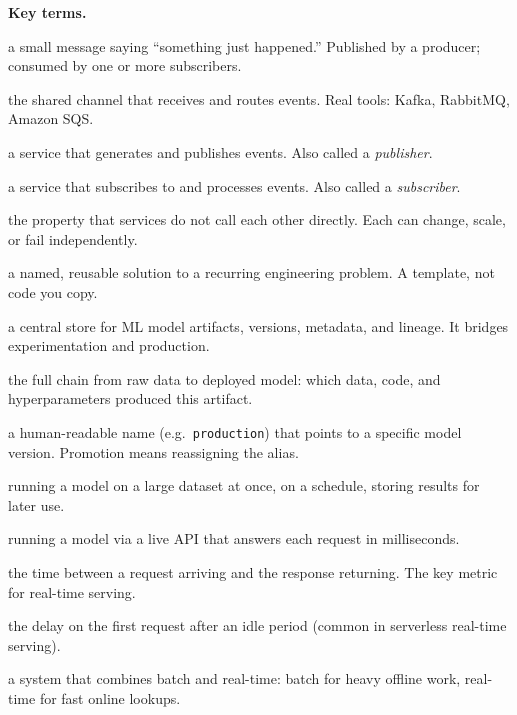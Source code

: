 \documentclass[a4paper,11pt]{article}
\begin{document}
\noindent\textbf{Key terms.}
\begin{description}[leftmargin=9.5em,style=nextline,font=\normalfont\bfseries\color{navy}]
  \item[event] a small message saying ``something just happened.''
        Published by a producer; consumed by one or more subscribers.
  \item[event bus] the shared channel that receives and routes events.
        Real tools: Kafka, RabbitMQ, Amazon SQS.
  \item[producer] a service that generates and publishes events.
        Also called a \emph{publisher}.
  \item[consumer] a service that subscribes to and processes events.
        Also called a \emph{subscriber}.
  \item[decoupling] the property that services do not call each other
        directly. Each can change, scale, or fail independently.
  \item[design pattern] a named, reusable solution to a recurring
        engineering problem. A template, not code you copy.
  \item[model registry] a central store for ML model artifacts, versions,
        metadata, and lineage. It bridges experimentation and production.
  \item[model lineage] the full chain from raw data to deployed model:
        which data, code, and hyperparameters produced this artifact.
  \item[alias] a human-readable name (e.g.\ \texttt{production}) that
        points to a specific model version. Promotion means reassigning
        the alias.
  \item[batch prediction] running a model on a large dataset at once,
        on a schedule, storing results for later use.
  \item[online prediction] running a model via a live API that answers
        each request in milliseconds.
  \item[latency] the time between a request arriving and the response
        returning. The key metric for real-time serving.
  \item[cold start] the delay on the first request after an idle period
        (common in serverless real-time serving).
  \item[lambda architecture] a system that combines batch and real-time:
        batch for heavy offline work, real-time for fast online lookups.
\end{description}
\end{document}
